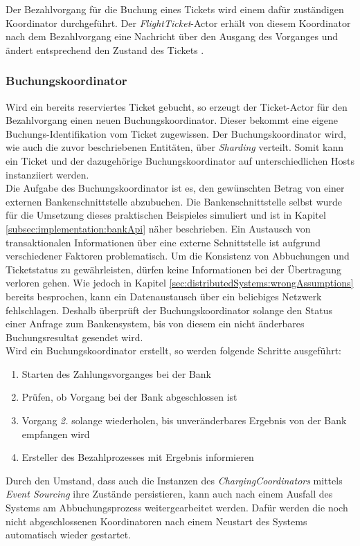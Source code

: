 Der Bezahlvorgang für die Buchung eines Tickets wird einem dafür zuständigen Koordinator durchgeführt. Der \textit{FlightTicket}-Actor erhält von diesem Koordinator nach dem Bezahlvorgang eine Nachricht über den Ausgang des Vorganges und ändert entsprechend den Zustand des Tickets .

\subsubsection{Buchungskoordinator}
\label{subsub:implementation:ChargingCoordinator}
Wird ein bereits reserviertes Ticket gebucht, so erzeugt der Ticket-Actor für den Bezahlvorgang einen neuen Buchungskoordinator. Dieser bekommt eine eigene Buchungs-Identifikation vom Ticket zugewissen. Der Buchungskoordinator wird, wie auch die zuvor beschriebenen Entitäten, über \textit{Sharding} verteilt. Somit kann ein Ticket und der dazugehörige Buchungskoordinator auf unterschiedlichen Hosts instanziiert werden. \\
Die Aufgabe des Buchungskoordinator ist es, den gewünschten Betrag von einer externen Bankenschnittstelle abzubuchen. Die Bankenschnittstelle selbst wurde für die Umsetzung dieses praktischen Beispieles simuliert und ist in Kapitel \ref{subsec:implementation:bankApi} näher beschrieben. Ein Austausch von transaktionalen Informationen über eine externe Schnittstelle ist aufgrund verschiedener Faktoren problematisch. Um die Konsistenz von Abbuchungen und Ticketstatus zu gewährleisten, dürfen keine Informationen bei der Übertragung verloren gehen. Wie jedoch in Kapitel \ref{sec:distributedSystems:wrongAssumptions} bereits besprochen, kann ein Datenaustausch über ein beliebiges Netzwerk fehlschlagen. Deshalb überprüft der Buchungskoordinator solange den Status einer Anfrage zum Bankensystem, bis von diesem ein nicht änderbares Buchungsresultat gesendet wird. \\
Wird ein Buchungskoordinator erstellt, so werden folgende Schritte ausgeführt:
\begin{enumerate}
    \item Starten des Zahlungsvorganges bei der Bank
    \item Prüfen, ob Vorgang bei der Bank abgeschlossen ist
    \item Vorgang \textit{2.} solange wiederholen, bis unveränderbares Ergebnis von der Bank empfangen wird
    \item Ersteller des Bezahlprozesses mit Ergebnis informieren
\end{enumerate}
Durch den Umstand, dass auch die Instanzen des \textit{ChargingCoordinators} mittels \textit{Event Sourcing} ihre Zustände persistieren, kann auch nach einem Ausfall des Systems am Abbuchungsprozess weitergearbeitet werden. Dafür werden die noch nicht abgeschlossenen Koordinatoren nach einem Neustart des Systems automatisch wieder gestartet. \\
